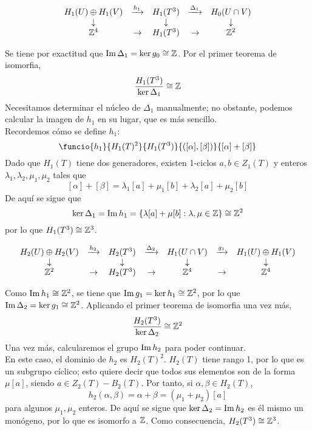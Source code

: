 \[\begin{array}{ccccccc}
H_1(U)\oplus H_1(V)	&\xrightarrow{h_1}	&H_1(T^3)		&\xrightarrow{\Delta_1}&H_0(U \cap V)\\
\downarrow			&					&\downarrow		&						&\downarrow\\
\mathbb{Z}^4			&\rightarrow		&H_1(T^3)		&\rightarrow			&\mathbb{Z}^2
\end{array}\]

Se tiene por exactitud que $\operatorname{Im} \Delta_1=\ker g_0\cong \mathbb{Z}$. Por el primer teorema de isomorfia, \[\frac{H_1(T^3)}{\ker \Delta_1} \cong \mathbb{Z}\] Necesitamos determinar el núcleo de $\Delta_1$ manualmente; no obstante, podemos calcular la imagen de $h_1$ en su lugar, que es más sencillo.
\\

Recordemos cómo se define $h_1$: \[\funcio{h_1}{H_1(T)^2}{H_1(T^3)}{([\alpha],[\beta])}{[\alpha]+[\beta]}\] Dado que $H_1(T)$ tiene dos generadores, existen 1-ciclos $a,b \in Z_1(T)$ y enteros $\lambda_1,\lambda_2,\mu_1,\mu_2$ tales que \[[\alpha]+[\beta]=\lambda_1[a]+\mu_1[b]+\lambda_2[a]+\mu_2[b]\] De aquí se sigue que \[\ker \Delta_1=\operatorname{Im} h_1=\{\lambda[a]+\mu[b]: \lambda,\mu \in \mathbb{Z}\} \cong \mathbb{Z}^2\] por lo que $H_1(T^3)\cong \mathbb{Z}^3$.

\[\begin{array}{ccccccc}
H_2(U)\oplus H_2(V)	&\xrightarrow{h_2}	&H_2(T^3)&\xrightarrow{\Delta_2}&H_1(U\cap V)&\xrightarrow{g_1}&H_1(U) \oplus H_1(V)\\
\downarrow&		&\downarrow		&	&\downarrow & 	&\downarrow\\
\mathbb{Z}^2& \rightarrow	&H_2(T^3)		&\rightarrow	&\mathbb{Z}^4 & \rightarrow & \mathbb{Z}^4
\end{array}\]

Como $\operatorname{Im} h_1\cong \mathbb{Z}^2$, se tiene que $\operatorname{Im} g_1=\ker h_1\cong \mathbb{Z}^2$, por lo que $\operatorname{Im} \Delta_2=\ker g_1\cong \mathbb{Z}^2$. Aplicando el primer teorema de isomorfia una vez más, \[\frac{H_2(T^3)}{\ker \Delta_2} \cong \mathbb{Z}^2\] Una vez más, calcularemos el grupo $\operatorname{Im} h_2$ para poder continuar.
\\

En este caso, el dominio de $h_2$ es $H_2(T)^2$. $H_2(T)$ tiene rango 1, por lo que es un subgrupo cíclico; esto quiere decir que todos sus elementos son de la forma $\mu [a]$, siendo $a \in Z_2(T)-B_2(T)$. Por tanto, si $\alpha,\beta \in H_2(T)$, \[h_2(\alpha,\beta)=\alpha+\beta=(\mu_1+\mu_2)[a]\] para algunos $\mu_1,\mu_2$ enteros. De aquí se sigue que $\ker \Delta_2=\operatorname{Im} h_2$ es él mismo un monógeno, por lo que es isomorfo a $\mathbb{Z}$. Como consecuencia, $H_2(T^3)\cong \mathbb{Z}^3$.
\\

